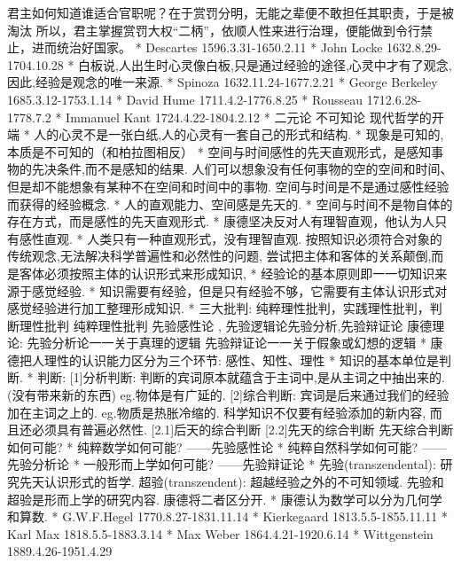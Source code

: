 		君主如何知道谁适合官职呢？在于赏罚分明，无能之辈便不敢担任其职责，于是被淘汰
		所以，君主掌握赏罚大权“二柄”，依顺人性来进行治理，便能做到令行禁止，进而统治好国家。 
* Descartes	1596.3.31-1650.2.11
* John Locke	1632.8.29-1704.10.28
	* 白板说,人出生时心灵像白板,只是通过经验的途径,心灵中才有了观念,因此,经验是观念的唯一来源.
* Spinoza 	1632.11.24-1677.2.21
* George Berkeley	1685.3.12-1753.1.14
* David Hume	1711.4.2-1776.8.25
* Rousseau	1712.6.28-1778.7.2
* Immanuel Kant	1724.4.22-1804.2.12
	* 二元论 不可知论 现代哲学的开端 
	* 人的心灵不是一张白纸,人的心灵有一套自己的形式和结构.
	* 现象是可知的, 本质是不可知的（和柏拉图相反）
	* 空间与时间感性的先天直观形式，是感知事物的先决条件,而不是感知的结果.
		人们可以想象没有任何事物的空的空间和时间、但是却不能想象有某种不在空间和时间中的事物.
		空间与时间是不是通过感性经验而获得的经验概念.
	* 人的直观能力、空间感是先天的.
	* 空间与时间不是物自体的存在方式，而是感性的先天直观形式.
	* 康德坚决反对人有理智直观，他认为人只有感性直观.
	* 人类只有一种直观形式，没有理智直观.
	按照知识必须符合对象的传统观念,无法解决科学普遍性和必然性的问题,
	尝试把主体和客体的关系颠倒,而是客体必须按照主体的认识形式来形成知识,
	* 经验论的基本原则即一一切知识来源于感觉经验.
	* 知识需要有经验，但是只有经验不够，它需要有主体认识形式对感觉经验进行加工整理形成知识.
	* 三大批判: 纯粹理性批判，实践理性批判，判断理性批判
		纯粹理性批判{ 先验感性论 , 先验逻辑论{先验分析,先验辩证论} }
		康德理论: 先验分析论一一关于真理的逻辑    先验辩证论一一关于假象或幻想的逻辑
	* 康德把人理性的认识能力区分为三个环节: 感性、知性、理性
	* 知识的基本单位是判断.
	* 判断: 
		[1]分析判断: 判断的宾词原本就蕴含于主词中,是从主词之中抽出来的. (没有带来新的东西) eg.物体是有广延的.
		[2]综合判断: 宾词是后来通过我们的经验加在主词之上的. eg.物质是热胀冷缩的.
			科学知识不仅要有经验添加的新内容, 而且还必须具有普遍必然性.
		[2.1]后天的综合判断
		[2.2]先天的综合判断
			先天综合判断如何可能?
			* 纯粹数学如何可能?	——先验感性论
			* 纯粹自然科学如何可能?	——先验分析论
			* 一般形而上学如何可能?	——先验辩证论
	* 先验(transzendental): 研究先天认识形式的哲学.
	  超验(transzendent): 超越经验之外的不可知领域.
		先验和超验是形而上学的研究内容. 康德将二者区分开.
	* 康德认为数学可以分为几何学和算数.
* G.W.F.Hegel	1770.8.27-1831.11.14
* Kierkegaard	1813.5.5-1855.11.11
* Karl Max	1818.5.5-1883.3.14
* Max Weber	1864.4.21-1920.6.14
* Wittgenstein	1889.4.26-1951.4.29
